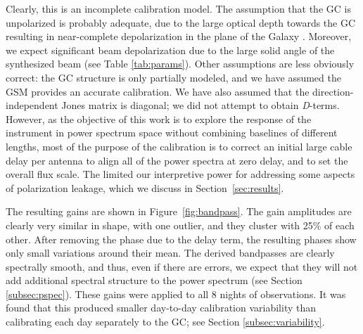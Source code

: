 \documentclass[twocolumn, trackchanges]{aastex61}
\begin{document}
{Clearly, this is an incomplete calibration model. The assumption that the GC is unpolarized is probably adequate, due to the large optical depth towards the GC \citep{Oppermann.12} resulting in near-complete depolarization in the plane of the Galaxy \citep{Wolleben.06}.  Moreover, we expect significant beam depolarization due to the large solid angle of the synthesized beam (see Table \ref{tab:params}).
Other assumptions are less obviously correct: 
the GC structure is only partially modeled, and we have assumed the GSM provides an accurate calibration.  We have also assumed that the direction-independent Jones matrix is diagonal; we did not attempt to obtain \textit{D}-terms.  However, as the objective of this work is to explore the response of the instrument in power spectrum space without combining baselines of different lengths, most of the purpose of the calibration is to correct an initial large cable delay per antenna to align all of the power spectra at zero delay, and to set the overall flux scale.  The limited our interpretive power for addressing some aspects of polarization leakage, which we discuss in Section~\ref{sec:results}.

The resulting gains are shown in Figure~\ref{fig:bandpass}.  The gain amplitudes are clearly very similar in shape, with one outlier, and they cluster with 25\% of each other.  After removing the phase due to the delay term, the resulting phases show only small variations around their mean.  The derived bandpasses are clearly spectrally smooth, and thus, even if there are errors, we expect that they will not add additional spectral structure to the power spectrum (see Section \ref{subsec:pspec}).  These gains were applied to all 8 nights of observations. It was found that this produced smaller day-to-day calibration variability than calibrating each day separately to the GC; see Section \ref{subsec:variability}.   


}
\end{document}
